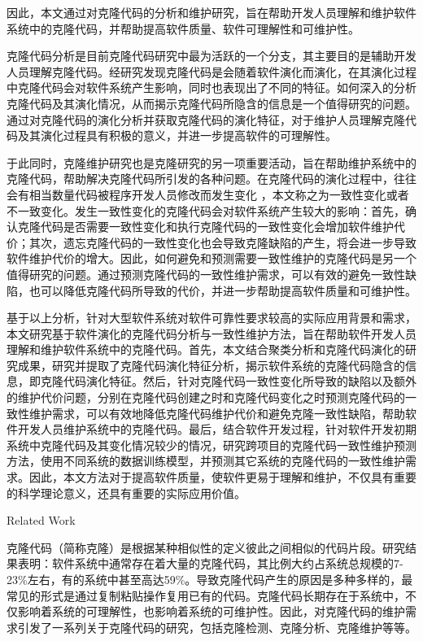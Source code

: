 因此，本文通过对克隆代码的分析和维护研究，旨在帮助开发人员理解和维护软件系统中的克隆代码，并帮助提高软件质量、软件可理解性和可维护性。

克隆代码分析是目前克隆代码研究中最为活跃的一个分支，其主要目的是辅助开发人员理解克隆代码。经研究发现克隆代码是会随着软件演化而演化\cite{kim2005empirical}\cite{saha2011automatic}，在其演化过程中克隆代码会对软件系统产生影响，同时也表现出了不同的特征\cite{gode2011frequency}\cite{mondal2012dispersion}\cite{rahman2014change}。如何深入的分析克隆代码及其演化情况，从而揭示克隆代码所隐含的信息是一个值得研究的问题。通过对克隆代码的演化分析并获取克隆代码的演化特征，对于维护人员理解克隆代码及其演化过程具有积极的意义，并进一步提高软件的可理解性。

于此同时，克隆维护研究也是克隆研究的另一项重要活动，旨在帮助维护系统中的克隆代码，帮助解决克隆代码所引发的各种问题。在克隆代码的演化过程中，往往会有相当数量代码被程序开发人员修改而发生变化\cite{krinke2007study}\cite{aversano2007clones} ，本文称之为一致性变化或者不一致变化。发生一致性变化的克隆代码会对软件系统产生较大的影响：首先，确认克隆代码是否需要一致性变化和执行克隆代码的一致性变化会增加软件维护代价；其次，遗忘克隆代码的一致性变化也会导致克隆缺陷的产生\cite{juergens2009code}\cite{wagner2016relationship}，将会进一步导致软件维护代价的增大。因此，如何避免和预测需要一致性维护的克隆代码是另一个值得研究的问题。通过预测克隆代码的一致性维护需求，可以有效的避免一致性缺陷，也可以降低克隆代码所导致的代价，并进一步帮助提高软件质量和可维护性。

基于以上分析，针对大型软件系统对软件可靠性要求较高的实际应用背景和需求，本文研究基于软件演化的克隆代码分析与一致性维护方法，旨在帮助软件开发人员理解和维护软件系统中的克隆代码。首先，本文结合聚类分析和克隆代码演化的研究成果，研究并提取了克隆代码演化特征分析，揭示软件系统的克隆代码隐含的信息，即克隆代码演化特征。然后，针对克隆代码一致性变化所导致的缺陷以及额外的维护代价问题，分别在克隆代码创建之时和克隆代码变化之时预测克隆代码的一致性维护需求，可以有效地降低克隆代码维护代价和避免克隆一致性缺陷，帮助软件开发人员维护系统中的克隆代码。最后，结合软件开发过程，针对软件开发初期系统中克隆代码及其变化情况较少的情况，研究跨项目的克隆代码一致性维护预测方法，使用不同系统的数据训练模型，并预测其它系统的克隆代码的一致性维护需求。因此，本文方法对于提高软件质量，使软件更易于理解和维护，不仅具有重要的科学理论意义，还具有重要的实际应用价值。


{Related Work}

克隆代码（简称克隆）是根据某种相似性的定义彼此之间相似的代码片段\cite{roy2007survey}。研究结果表明：软件系统中通常存在着大量的克隆代码，其比例大约占系统总规模的7-23\%左右，有的系统中甚至高达59\%。导致克隆代码产生的原因是多种多样的，最常见的形式是通过复制粘贴操作复用已有的代码。克隆代码长期存在于系统中，不仅影响着系统的可理解性，也影响着系统的可维护性。因此，对克隆代码的维护需求引发了一系列关于克隆代码的研究，包括克隆检测、克隆分析、克隆维护等等。

